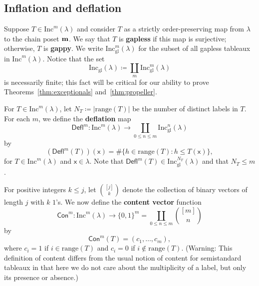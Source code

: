 \documentclass[12pt]{amsart}
\newcommand{\x}{\ensuremath{\mathsf{x}}}
\theoremstyle{definition}
\theoremstyle{remark}
\numberwithin{equation}{section}
\newcommand{\inc}{\ensuremath{\mathrm{Inc}}}
\newcommand{\incgl}{\inc_{\mathrm{gl}}}
\newcommand{\deflate}{\ensuremath{\mathsf{Defl}}}
\newcommand{\content}{\ensuremath{\mathsf{Con}}}
\begin{document}
\subsection{Inflation and deflation}
Suppose $T \in \inc^m(\lambda)$ and consider $T$ as a strictly order-preserving map from $\lambda$ to the chain poset ${\bf m}$. We say that $T$ is {\bf gapless} if this map is surjective; otherwise, $T$ is {\bf gappy}. We write $\incgl^m(\lambda)$ for the subset of all gapless tableaux in $\inc^m(\lambda)$. Notice that the set 
\[
\incgl(\lambda) \coloneqq \coprod_{m} \incgl^m(\lambda)
\]
is necessarily finite; this fact will be critical for our ability to prove Theorems~\ref{thm:exceptionals} and~\ref{thm:propeller}.

For $T \in \inc^m(\lambda)$, let $N_T \coloneqq |\mathrm{range}(T)|$ be the number of distinct labels in $T$. For each $m$, we define the {\bf deflation} map \[\deflate^m : \inc^m(\lambda) \to \coprod_{0 \leq n \leq m} \incgl^n(\lambda)\] by
\[
(\deflate^m(T))(\x) =
\# \{ h \in \mathrm{range}(T): h \leq T(\x) \} ,
\]
for $T \in \inc^m(\lambda)$ and $\x \in \lambda$. Note that $\deflate^m(T) \in \incgl^{N_T}(\lambda)$ and that $N_T \leq m$.

For positive integers $k \leq j$, let $\binom{[j]}{k}$ denote the collection of binary vectors of length $j$ with $k$ $1$'s. We now define the {\bf content vector} function 
\[
 \content^m : \inc^m(\lambda) \to \{ 0, 1\}^m = \coprod_{0 \leq  n \leq m} \binom{[m]}{n}
 \] 
 by 
\[
\content^m(T) = (c_1, \dots, c_m),
\] 
where $c_i = 1$ if $i \in \mathrm{range}(T)$ and $c_i = 0$ if $i \notin \mathrm{range}(T)$. (Warning: This definition of content differs from the usual notion of content for semistandard tableaux in that here we do not care about the multiplicity of a label, but only its presence or absence.)
\end{document}
